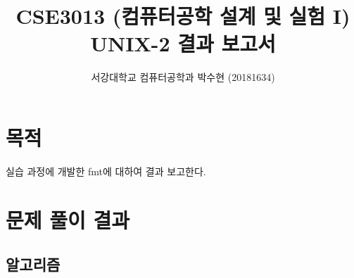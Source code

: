 



\title{CSE3013 (컴퓨터공학 설계 및 실험 I) \space \newline UNIX-2 결과 보고서}
\author{서강대학교 컴퓨터공학과 박수현 (20181634)}
\maketitle

\section{목적}
실습 과정에 개발한 fmt에 대하여 결과 보고한다.

\section{문제 풀이 결과}

\subsection{알고리즘}

